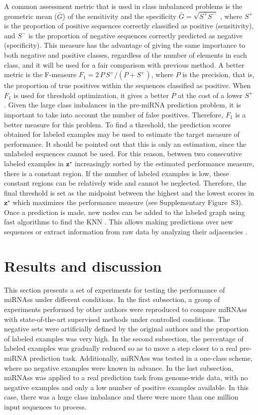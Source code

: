 \documentclass{article}
\begin{document}
A common assessment metric that is used in class imbalanced problems is the geometric mean ($\bar{G}$) of the sensitivity and the specificity $\bar{G} = \sqrt{S^{+} S^{-}}$ \citep{batuwita2009micropred,gudys2013huntmi}, where $S^{+}$ is the proportion of positive sequences correctly classified as positive (sensitivity), and $S^{-}$ is the proportion of negative sequences correctly predicted as negative (specificity). This measure has the advantage of giving the same importance to both negative and positive classes, regardless of the number of elements in each class, and it will be used for a fair comparison with previous method. A better metric is the \mbox{F-measure} $F_{1} = 2 \, P \, S^{+}/(P + S^{+})$, where $P$ is the precision, that is, the proportion of true positives within the sequences classified as positive. When $F_{1}$ is used for threshold optimization, it  gives a better $P$ at the cost of a lower $S^{+}$. Given the large class imbalances in the pre-miRNA prediction problem, it is important to take into account the number of false positives. Therefore, $F_{1}$ is a better measure for this problem. To find a threshold, the prediction scores obtained for labeled examples may be used to estimate the target measure of performance. It should be pointed out that this is only an estimation, since the unlabeled sequences cannot be used. For this reason, between two consecutive labeled examples in $\mathbf{z}^\star$ increasingly sorted by the estimated performance measure, there is a constant region. If the number of labeled examples is low, these constant regions can be relatively wide and cannot be neglected. Therefore, the final threshold is set as the midpoint between the highest and the lowest scores in $\mathbf{z}^\star$ which maximizes the performance measure (see Supplementary Figure~S3). Once a prediction is made, new nodes can be added to the labeled graph using fast algorithms to find the KNN \citep{malkov2014approximate}. This allows making predictions over new sequences or extract information from raw data by analyzing their adjacencies \citep{chapelle2006semi}.

\section{Results and discussion} \label{sec:results}
This section presents a set of experiments for testing the performance of miRNAss under different conditions. In the first subsection, a group of experiments performed by other authors were reproduced to compare miRNAss with state-of-the-art supervised methods under controlled conditions. The negative sets were artificially defined by the original authors and the proportion of labeled examples was very high. In the second subsection, the percentage of labeled examples was gradually reduced so as to move a step closer to a real pre-miRNA prediction task. Additionally, miRNAss was tested in a one-class scheme, where no negative examples were known in advance. In the last subsection, miRNAss was applied to a real prediction task from genome-wide data, with no negative examples and only a low number of positive examples available. In this case, there was a huge class imbalance and there were more than one million input sequences to process.
\end{document}
